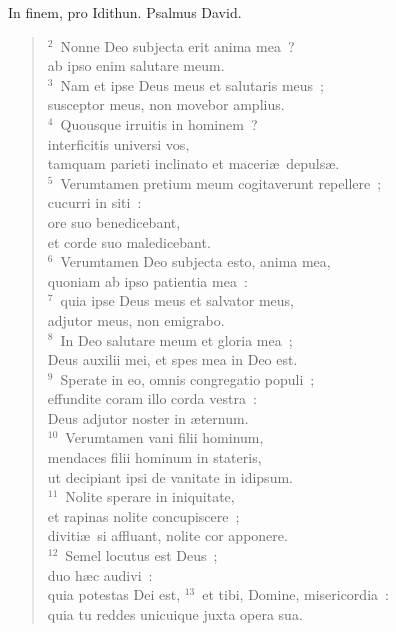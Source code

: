 \bchapter
\lettrine[lines=3,image=true,loversize=0.05,lraise=-0.03]{I}{}n finem, pro Idithun. Psalmus David.
\begin{flushleft}\begin{verse}\vspace{6pt}${}^{2}$~Nonne Deo subjecta erit anima mea~?\\ ab ipso enim salutare meum.\\
${}^{3}$~Nam et ipse Deus meus et salutaris meus~;\\ susceptor meus, non movebor amplius.\\
${}^{4}$~Quousque irruitis in hominem~?\\ interficitis universi vos,\\ tamquam parieti inclinato et maceri\ae\ depuls\ae .\\
${}^{5}$~Verumtamen pretium meum cogitaverunt repellere~;\\ cucurri in siti~:\\ ore suo benedicebant,\\ et corde suo maledicebant.\\
${}^{6}$~Verumtamen Deo subjecta esto, anima mea,\\ quoniam ab ipso patientia mea~:\\
${}^{7}$~quia ipse Deus meus et salvator meus,\\ adjutor meus, non emigrabo.\\
${}^{8}$~In Deo salutare meum et gloria mea~;\\ Deus auxilii mei, et spes mea in Deo est.\\
${}^{9}$~Sperate in eo, omnis congregatio populi~;\\ effundite coram illo corda vestra~:\\ Deus adjutor noster in \ae ternum.\\
${}^{10}$~Verumtamen vani filii hominum,\\ mendaces filii hominum in stateris,\\ ut decipiant ipsi de vanitate in idipsum.\\
${}^{11}$~Nolite sperare in iniquitate,\\ et rapinas nolite concupiscere~;\\ diviti\ae\ si affluant, nolite cor apponere.\\
${}^{12}$~Semel locutus est Deus~;\\ duo h\ae c audivi~:\\ quia potestas Dei est,
${}^{13}$~et tibi, Domine, misericordia~:\\ quia tu reddes unicuique juxta opera sua.\end{verse}\end{flushleft}



